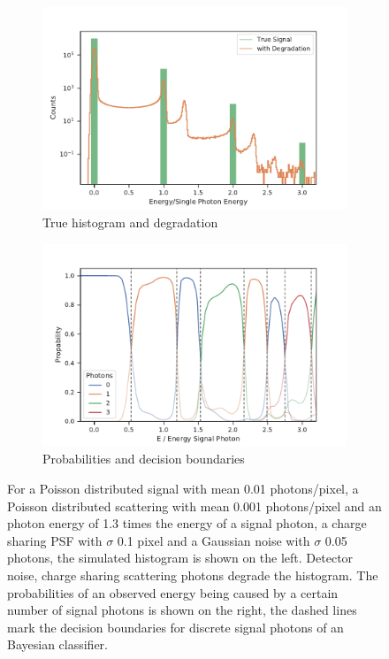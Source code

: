 \begin{figure}
	\centering
	\begin{subfigure}[b]{0.45\textwidth}
		\includegraphics[width=\linewidth]{images/sharing.pdf}
		\caption{True histogram and degradation}
		\label{fig:degrad}
	\end{subfigure}
	\begin{subfigure}[b]{0.45\textwidth}
		\includegraphics[width=\linewidth]{images/probs.pdf}
		\caption{Probabilities and decision boundaries}
		\label{fig:probs}
	\end{subfigure}
	
	\caption[Histogram, probabilities and decision boundaries for the photon number under the influence of charge sharing and noise]{For a Poisson distributed signal with mean 0.01 photons/pixel, a Poisson distributed scattering with mean 0.001 photons/pixel and an photon energy of 1.3 times the energy of a signal photon, a charge sharing PSF with $\sigma$ 0.1 pixel and a Gaussian noise with $\sigma$ 0.05 photons, the simulated histogram is shown on the left. Detector noise, charge sharing scattering photons degrade the histogram. The probabilities of an observed energy being caused by a certain number of signal photons is shown on the right, the dashed lines mark the decision boundaries for discrete signal photons of an Bayesian classifier.} 
\end{figure}


